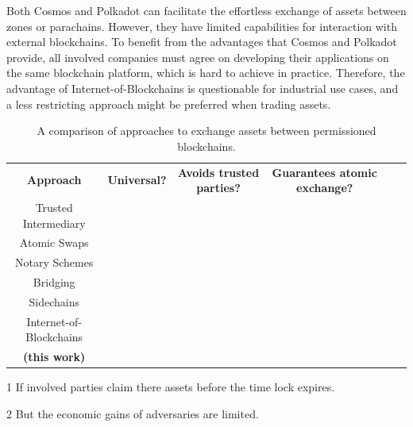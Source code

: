 Both Cosmos and Polkadot can facilitate the effortless exchange of assets between zones or parachains.
However, they have limited capabilities for interaction with external blockchains.
To benefit from the advantages that Cosmos and Polkadot provide, all involved companies must agree on developing their applications on the same blockchain platform, which is hard to achieve in practice.
Therefore, the advantage of Internet-of-Blockchains is questionable for industrial use cases, and a less restricting approach might be preferred when trading assets.

\begin{table}[t]
	\centering
	\begin{threeparttable}
		\begin{tabular}{ c c c c c c } 
			\hline
			\textbf{Approach} & \textbf{Universal?} & \textbf{Avoids trusted parties?} & \textbf{Guarantees atomic exchange?} \\
			Trusted Intermediary & \greencheck & \redcross & \redcross \\
			Atomic Swaps & \redcross & \greencheck & \greencheck\tnote{1} \\
			Notary Schemes & \greencheck & \redcross & \redcross \\
			Bridging & \redcross & \greencheck & \redcross \\
			Sidechains & \redcross & \greencheck & \greencheck \\
			Internet-of-Blockchains & \redcross & \greencheck & \greencheck \\ \hline
			\textbf{\ModelName{} (this work)} & \greencheck & \greencheck & \redcross\tnote{2} \\
			\hline
		\end{tabular}
		\begin{tablenotes}
			\item [1] If involved parties claim there assets before the time lock expires.
			\item [2] But the economic gains of adversaries are limited.
		\end{tablenotes}
	\end{threeparttable}
	\caption{A comparison of approaches to exchange assets between permissioned blockchains.}
	\label{tbl:cross_chain_trading_mechanisms}
\end{table}

